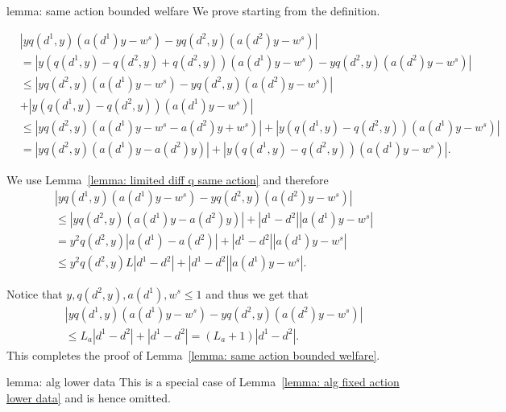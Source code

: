 \begin{proofof}{lemma: same action bounded welfare}
We prove starting from the definition.

\begin{align*}
& \left| yq(d^1, y)\left(a(d^1)y - w^s \right) - yq(d^2, y)\left(a(d^2)y - w^s \right) \right| \\
&= \left| y\left( q(d^1, y) - q(d^2, y) + q(d^2, y) \right)\left(a(d^1)y - w^s \right) - yq(d^2, y)\left(a(d^2)y - w^s \right) \right| \\
&\leq \left| yq(d^2, y)\left(a(d^1)y - w^s \right) - yq(d^2, y)\left(a(d^2)y - w^s \right) \right| \\
&+ \left| y\left( q(d^1, y) - q(d^2, y)\right)\left(a(d^1)y - w^s \right) \right| \\
&\leq \left| yq(d^2, y)\left(a(d^1)y - w^s - a(d^2)y + w^s\right) \right| + \left| y\left( q(d^1, y) - q(d^2, y)\right)\left(a(d^1)y - w^s \right) \right| \\
&= \left| yq(d^2, y)\left(a(d^1)y - a(d^2)y\right) \right| + \left| y\left( q(d^1, y) - q(d^2, y)\right)\left(a(d^1)y - w^s \right) \right|.
\end{align*}

We use Lemma~\ref{lemma: limited diff q same action} and therefore
\begin{align*}
& \left| yq(d^1, y)\left(a(d^1)y - w^s \right) - yq(d^2, y)\left(a(d^2)y - w^s \right) \right| \\
&\leq \left| yq(d^2, y)\left(a(d^1)y - a(d^2)y\right) \right| + \left| d^1 - d^2\right| \left|a(d^1)y - w^s \right| \\
&= y^2 q(d^2, y) \left| a(d^1) - a(d^2) \right| + \left| d^1 - d^2\right| \left|a(d^1)y - w^s \right| \\
&\leq y^2 q(d^2, y) L \left| d^1 - d^2 \right| + \left| d^1 - d^2\right| \left|a(d^1)y - w^s \right|.
\end{align*}

Notice that $y, q(d^2, y), a(d^1), w^s \leq 1$ and thus we get that
\begin{align*}
& \left| yq(d^1, y)\left(a(d^1)y - w^s \right) - yq(d^2, y)\left(a(d^2)y - w^s \right) \right| \\
&\leq L_a\left| d^1 - d^2 \right| + \left| d^1 - d^2 \right| = (L_a+1) \left| d^1 - d^2 \right|.
\end{align*}
This completes the proof of Lemma~\ref{lemma: same action bounded welfare}.
\end{proofof}


\begin{proofof}{lemma: alg lower data}
This is a special case of Lemma~\ref{lemma: alg fixed action lower data} and is hence omitted.
\end{proofof}